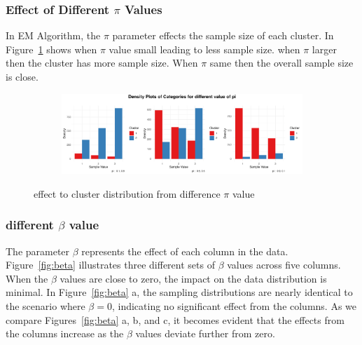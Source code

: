 \documentclass{article}
\begin{document}
\subsubsection*{Effect of Different $\pi$ Values}
In EM Algorithm, the $\pi$ parameter effects the sample size of each cluster. 
In Figure~\ref{fig:pi} shows when $\pi$ value small leading to less sample size.
when $\pi$ larger then the cluster has more sample size.
When $\pi$ same then the overall sample size is close.
\begin{figure}[h]
  \centering
  \begin{subfigure}{1.0\textwidth}
      \centering
      \includegraphics[width=\textwidth]{images/para_sim/pi.png}
  \end{subfigure}
  \caption{effect to cluster distribution from difference $\pi$ value}
  \label{fig:pi}
\end{figure}

\subsubsection*{different $\beta$ value}
The parameter $\beta$ represents the effect of each column in the data. 
Figure~\ref{fig:beta} illustrates three different sets of $\beta$ values across five columns. 
When the $\beta$ values are close to zero, the impact on the data distribution is minimal. 
In Figure~\ref{fig:beta} a, the sampling distributions are nearly identical to the scenario where $\beta = 0$, 
indicating no significant effect from the columns. 
As we compare Figures~\ref{fig:beta} a, b, and c, it becomes evident that the effects 
from the columns increase as the $\beta$ values deviate further from zero.
\end{document}
